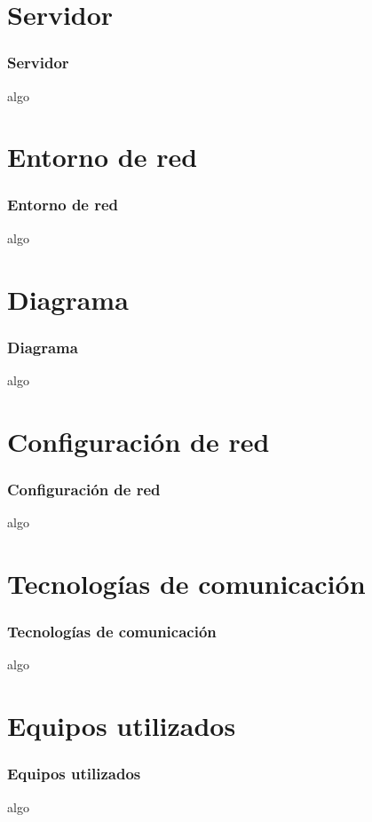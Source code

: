 \section{Servidor}
  \begin{frame}
    \frametitle{Servidor}
    algo
  \end{frame}
\section{Entorno de red}
  \begin{frame}
    \frametitle{Entorno de red}
    algo
  \end{frame}
\section{Diagrama}
  \begin{frame}
    \frametitle{Diagrama}
    algo
  \end{frame}
\section{Configuraci\'on de red}
  \begin{frame}
    \frametitle{Configuraci\'on de red}
    algo
  \end{frame}
\section{Tecnolog\'ias de comunicaci\'on}
  \begin{frame}
    \frametitle{Tecnolog\'ias de comunicaci\'on}
    algo
  \end{frame}
\section{Equipos utilizados}
  \begin{frame}
    \frametitle{Equipos utilizados}
    algo
  \end{frame}
